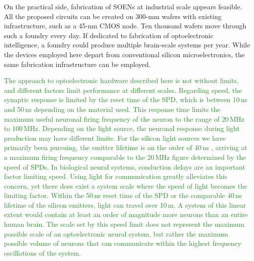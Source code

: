 \documentclass{article}
\begin{document}
\begin{multicols}{2}
On the practical side, fabrication of SOENs at industrial scale appears feasible. All the proposed circuits can be created on 300-mm wafers with existing infrastructure, such as a 45-nm CMOS node. Ten thousand wafers move through such a foundry every day. If dedicated to fabrication of optoelectronic intelligence, a foundry could produce multiple brain-scale systems per year. While the devices employed here depart from conventional silicon microelectronics, the same fabrication infrastructure can be employed. 

\textcolor{ForestGreen}{The approach to optoelectronic hardware described here is not without limits, and different factors limit performance at different scales. Regarding speed, the synaptic response is limited by the reset time of the SPD, which is between 10\,ns and 50\,ns depending on the material used. This response time limits the maximum useful neuronal firing frequency of the neuron to the range of 20\,MHz to 100\,MHz. Depending on the light source, the neuronal response during light production may have different limits. For the silicon light sources we have primarily been pursuing, the emitter lifetime is on the order of 40\,ns \cite{buta2020}, arriving at a maximum firing frequency comparable to the 20\,MHz figure determined by the speed of SPDs. In biological neural systems, conduction delays are an important factor limiting speed. Using light for communication greatly alleviates this concern, yet there does exist a system scale where the speed of light becomes the limiting factor. Within the 50\,ns reset time of the SPD or the comparable 40\,ns lifetime of the silicon emitters, light can travel over 10\,m. A system of this linear extent would contain at least an order of magnitude more neurons than an entire human brain. The scale set by this speed limit does not represent the maximum possible scale of an optoelectronic neural system, but rather the maximum possible volume of neurons that can communicate within the highest frequency oscillations of the system.}


\end{multicols}
\end{document}
